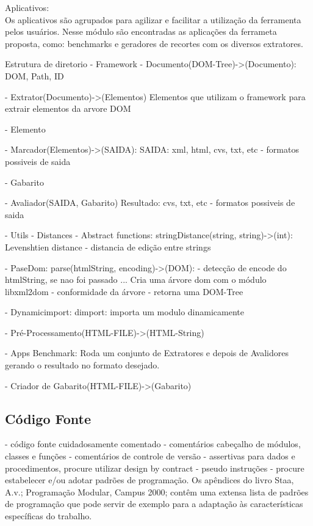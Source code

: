 \documentclass{acm_proc_article-sp}
\numberwithin{equation}{section}
\begin{document}
 Aplicativos: \\
  Os aplicativos são agrupados para agilizar e facilitar a utilização da
  ferramenta pelos usuários. Nesse módulo são encontradas as aplicações
  da ferrameta proposta, como: benchmarks e geradores de recortes com os
  diversos extratores.


Estrutura de diretorio
- Framework 
  - Documento(DOM-Tree)->(Documento):
    DOM, Path, ID

  - Extrator(Documento)->(Elementos)
    Elementos que utilizam o framework para extrair elementos da arvore DOM

  - Elemento

  - Marcador(Elementos)->(SAIDA):
    SAIDA: xml, html, cvs, txt, etc - formatos possiveis de saida

  - Gabarito

  - Avaliador(SAIDA, Gabarito)
    Resultado: cvs, txt, etc - formatos possiveis de saida

  - Utils
    - Distances - Abstract functions:
      stringDistance(string, string)->(int):
        Levenshtien distance - distancia de edição entre strings

    - PaseDom:
      parse(htmlString, encoding)->(DOM):
        - detecção de encode do htmlString, se nao foi passado
        ...
        Cria uma árvore dom com o módulo libxml2dom
        - conformidade da árvore
        - retorna uma DOM-Tree

    - Dynamicimport:
      dimport:
        importa um modulo dinamicamente
	
    - Pré-Processamento(HTML-FILE)->(HTML-String)

  - Apps
    Benchmark:
      Roda um conjunto de Extratores e depois de Avalidores gerando o
      resultado no formato desejado.

- Criador de Gabarito(HTML-FILE)->(Gabarito)

\subsection{Código Fonte}
      - código fonte cuidadosamente comentado
                  - comentários cabeçalho de módulos, classes e funções
                  - comentários de controle de versão
                  - assertivas para dados e procedimentos, procure utilizar design     by contract
                  - pseudo instruções
                  - procure estabelecer e/ou adotar padrões de programação. Os apêndices do livro Staa, A.v.; Programação Modular, Campus 2000; contêm uma extensa lista de padrões de programação que pode servir de exemplo para a adaptação às características específicas do trabalho. 
\end{document}
